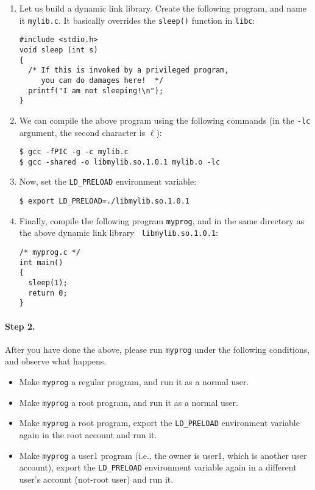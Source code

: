   \begin{enumerate}
  \item Let us build a dynamic link library. Create the following program,
  and name it {\tt mylib.c}. It basically overrides the {\tt sleep()} function 
  in {\tt libc}:
\begin{lstlisting}
#include <stdio.h>
void sleep (int s)
{
  /* If this is invoked by a privileged program, 
     you can do damages here!  */
  printf("I am not sleeping!\n");
}
\end{lstlisting}

  \item We can compile the above program using the following commands (in the 
  {\tt -lc} argument, the second character is $\ell$):
\begin{lstlisting}
$ gcc -fPIC -g -c mylib.c
$ gcc -shared -o libmylib.so.1.0.1 mylib.o -lc
\end{lstlisting}

  

  \item Now, set the {\tt LD\_PRELOAD} environment variable:  
\begin{lstlisting}
$ export LD_PRELOAD=./libmylib.so.1.0.1  
\end{lstlisting}

  \item Finally, compile the following program {\tt myprog}, and 
  in the same directory as the above dynamic link library {\tt
  libmylib.so.1.0.1}:
\begin{lstlisting}
/* myprog.c */
int main()
{
  sleep(1);
  return 0;
}
\end{lstlisting}
\end{enumerate}


\paragraph{Step 2.} 
After you have done the above, please run {\tt myprog} under the following
conditions, and observe what happens. 

  \begin{itemize}
  \item Make {\tt myprog} a regular program, and run it as a normal user.
  \item Make {\tt myprog} a \setuid root program, and run it as a normal user.
  \item Make {\tt myprog} a \setuid root program, export the {\tt LD\_PRELOAD}
  environment variable again in the root account and run it. 

  \item Make {\tt myprog} a \setuid user1 program (i.e., the owner is user1, which 
        is another user account), export the {\tt LD\_PRELOAD} environment variable 
	again in a different user's account (not-root user) and run it.
  \end{itemize}



